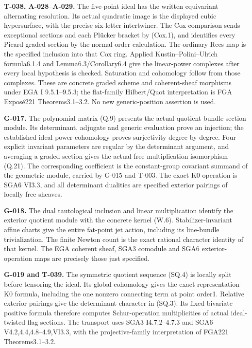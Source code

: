 \documentclass[
  10pt,
]{article}
\begin{document}
\textbf{T-038, A-028--A-029.} The five-point ideal has the written
equivariant alternating resolution. Its actual quadratic image is the
displayed cubic hypersurface, with the precise six-letter intertwiner.
The Cox comparison sends exceptional sections and each Plücker bracket
by (Cox.1), and identifies every Picard-graded section by the
normal-order calculation. The ordinary Rees map is the specified
inclusion into that Cox ring. Applied Kustin--Polini--Ulrich
formula6.1.4 and Lemma6.3/Corollary6.4 give the linear-power complexes
after every local hypothesis is checked. Saturation and cohomology
follow from those complexes. These are concrete graded scheme and
coherent-sheaf morphisms under EGA I 9.5.1--9.5.3; the flat-family
Hilbert/Quot interpretation is FGA Exposé221 Theorems3.1--3.2. No new
generic-position assertion is used.

\textbf{G-017.} The polynomial matrix (Q.9) presents the actual
quotient-bundle section module. Its determinant, adjugate and generic
evaluation prove an injection; the established ideal-power cohomology
proves surjectivity degree by degree. Four explicit invariant parameters
are regular by the determinant argument, and averaging a graded section
gives the actual free multiplication isomorphism (Q.21). The
corresponding coefficient is the constant-group covariant summand of the
geometric module, carried by G-015 and T-003. The exact K0 operation is
SGA6 VI3.3, and all determinant dualities are specified exterior
pairings of locally free sheaves.

\textbf{G-018.} The dual tautological inclusion and linear
multiplication identify the exterior quotient module with the concrete
kernel (W.6). Stabilizer-invariant affine charts give the entire
fat-point jet action, including its line-bundle trivialization. The
finite Newton count is the exact rational character identity of that
kernel. The EGA coherent sheaf, SGA3 comodule and SGA6
exterior-operation maps are precisely those just specified.

\textbf{G-019 and T-039.} The symmetric quotient sequence (SQ.4) is
locally split before tensoring the ideal. Its global cohomology gives
the exact representation-K0 formula, including the one nonzero
connecting term at point order1. Relative exterior pairings give the
determinant character in (SQ.3). Its fixed bivariate positive formula
therefore computes Schur-operation multiplicities of actual
ideal-twisted flag sections. The transport uses SGA3 I4.7.2--4.7.3 and
SGA6 V4.2,4.4,4.8--4.9,VI3.3, with the projective-family interpretation
of FGA221 Theorems3.1--3.2.
\end{document}
